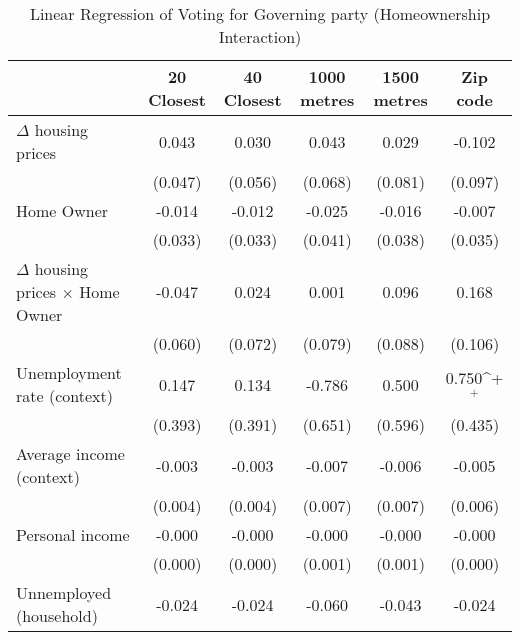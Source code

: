 \begin{table}[htbp]\centering
\def\sym#1{\ifmmode^{#1}\else\(^{#1}\)\fi}
\caption{Linear Regression of Voting for Governing party (Homeownership Interaction) } \footnotesize \label{home}
\begin{tabular}{l*{5}{c}}
\hline\hline
                    &\multicolumn{1}{c}{20 Closest}&\multicolumn{1}{c}{40 Closest}&\multicolumn{1}{c}{1000 metres}&\multicolumn{1}{c}{1500 metres}&\multicolumn{1}{c}{Zip code}\\
\hline
$\Delta$ housing prices&       0.043       &       0.030       &       0.043       &       0.029       &      -0.102       \\
                    &     (0.047)       &     (0.056)       &     (0.068)       &     (0.081)       &     (0.097)       \\
[1em]
Home Owner          &      -0.014       &      -0.012       &      -0.025       &      -0.016       &      -0.007       \\
                    &     (0.033)       &     (0.033)       &     (0.041)       &     (0.038)       &     (0.035)       \\
[1em]
$\Delta$ housing prices $\times$ Home Owner&      -0.047       &       0.024       &       0.001       &       0.096       &       0.168       \\
                    &     (0.060)       &     (0.072)       &     (0.079)       &     (0.088)       &     (0.106)       \\
[1em]
Unemployment rate (context)&       0.147       &       0.134       &      -0.786       &       0.500       &       0.750\sym{+}\\
                    &     (0.393)       &     (0.391)       &     (0.651)       &     (0.596)       &     (0.435)       \\
[1em]
Average income (context)&      -0.003       &      -0.003       &      -0.007       &      -0.006       &      -0.005       \\
                    &     (0.004)       &     (0.004)       &     (0.007)       &     (0.007)       &     (0.006)       \\
[1em]
Personal income     &      -0.000       &      -0.000       &      -0.000       &      -0.000       &      -0.000       \\
                    &     (0.000)       &     (0.000)       &     (0.001)       &     (0.001)       &     (0.000)       \\
[1em]
Unnemployed (household)&      -0.024       &      -0.024       &      -0.060       &      -0.043       &      -0.024       \\

\end{tabular}
\end{table}
